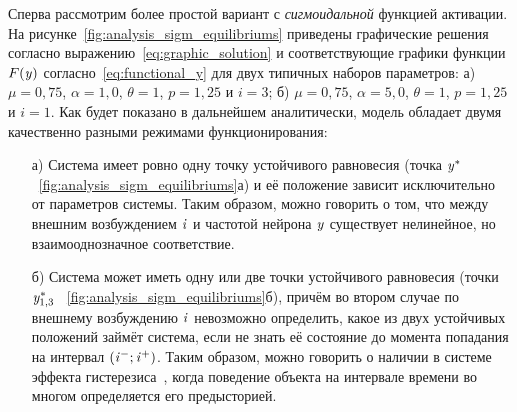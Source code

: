 Сперва рассмотрим более простой вариант с \textit{сигмоидальной} функцией активации. На рисунке~\ref{fig:analysis_sigm_equilibriums} приведены графические решения согласно выражению~\eqref{eq:graphic_solution} и соответствующие графики функции $F(\mathit{y})$ согласно~\eqref{eq:functional_y} для двух типичных наборов параметров: а) $\mu = 0,75$, $\alpha = 1,0$, $\theta = 1$, $p = 1,25$ и $i = 3$; б) $\mu = 0,75$, $\alpha = 5,0$, $\theta = 1$, $p = 1,25$ и $i = 1$. Как будет показано в дальнейшем аналитически, модель обладает двумя качественно разными режимами функционирования:
\begin{itemize}
    \item[а)] Система имеет ровно одну точку устойчивого равновесия (точка $\mathit{y}^{*}$ \onfigure~\ref{fig:analysis_sigm_equilibriums}а) и её положение зависит исключительно от параметров системы. Таким образом, можно говорить о том, что между внешним возбуждением $\mathit{i}$ и частотой нейрона $\mathit{y}$ существует нелинейное, но взаимооднозначное соответствие.
    \item[б)] Система может иметь одну или две точки устойчивого равновесия (точки $\mathit{y}_{1,3}^{*}$ \onfigure~\ref{fig:analysis_sigm_equilibriums}б), причём во втором случае по внешнему возбуждению $\mathit{i}$ невозможно определить, какое из двух устойчивых положений займёт система, если не знать её состояние до момента попадания на интервал $\left(\mathit{i}^{-}; \mathit{i}^{+}\right)$. Таким образом, можно говорить о наличии в системе эффекта гистерезиса~\cite{Krasnoselsky1983}, когда поведение объекта на интервале времени во многом определяется его предысторией.
\end{itemize}


